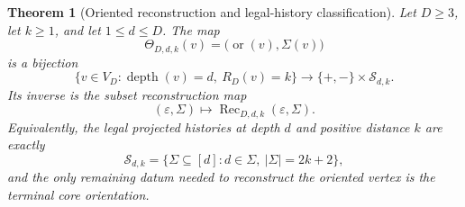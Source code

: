 \documentclass[11pt]{article}
\newtheorem{theorem}{Theorem}[section]
\theoremstyle{definition}
\theoremstyle{remark}
\newcommand{\depth}{\operatorname{depth}}
\newcommand{\Sfam}{\mathcal S}
\begin{document}
\begin{theorem}[Oriented reconstruction and legal-history classification]\label{thm:oriented-bijection}
Let $D\ge3$, let $k\ge1$, and let $1\le d\le D$.  The map
\[
\Theta_{D,d,k}(v)=\bigl(\operatorname{or}(v),\Sigma(v)\bigr)
\]
is a bijection
\[
\{v\in V_D:\depth(v)=d,\ R_D(v)=k\}
\longrightarrow
\{+,-\}\times\Sfam_{d,k}.
\]
Its inverse is the subset reconstruction map
\[
(\varepsilon,\Sigma)
\longmapsto
\operatorname{Rec}_{D,d,k}(\varepsilon,
\Sigma).
\]
Equivalently, the legal projected histories at depth $d$ and positive distance $k$ are exactly
\[
\Sfam_{d,k}=
\{\Sigma\subseteq[d]:d\in\Sigma,
\ |\Sigma|=2k+2\},
\]
and the only remaining datum needed to reconstruct the oriented vertex is the terminal core orientation.
\end{theorem}
\end{document}
